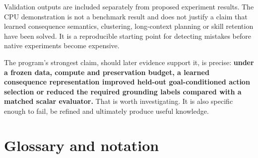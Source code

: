 \documentclass[
  11pt,
  a4paper,
]{article}
\begin{document}
Validation outputs are included separately from proposed experiment
results. The CPU demonstration is not a benchmark result and does not
justify a claim that learned consequence semantics, clustering,
long-context planning or skill retention have been solved. It is a
reproducible starting point for detecting mistakes before native
experiments become expensive.

The program's strongest claim, should later evidence support it, is
precise: \textbf{under a frozen data, compute and preservation budget, a
learned consequence representation improved held-out goal-conditioned
action selection or reduced the required grounding labels compared with
a matched scalar evaluator.} That is worth investigating. It is also
specific enough to fail, be refined and ultimately produce useful
knowledge.

\section{Glossary and notation}\label{glossary-and-notation}
\end{document}
